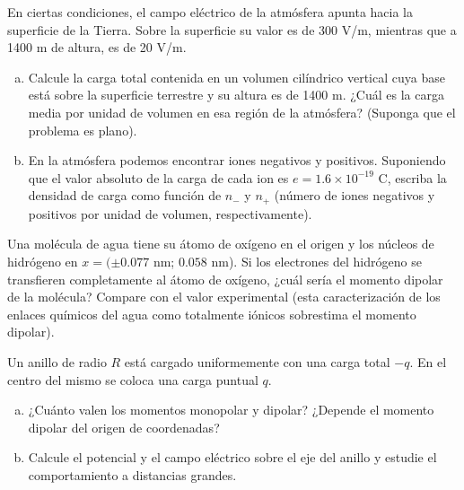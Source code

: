\documentclass[problemas]{guia}
\begin{document}
\begin{problema}{} 
    En ciertas condiciones, el campo eléctrico de la atmósfera apunta hacia la
    superficie de la Tierra. Sobre la superficie su valor es de 300 V/m, 
    mientras que a 1400 m de altura, es de 20 V/m.
    \begin{enumerate}[(a)]
        \item Calcule la carga total contenida en un volumen cilíndrico 
            vertical cuya base está sobre la superficie terrestre y su altura 
            es de 1400 m. ¿Cuál es la carga media por unidad de volumen en esa
            región de la atmósfera? (Suponga que el problema es plano). 
        \item En la atmósfera podemos encontrar iones negativos y positivos. 
            Suponiendo que el valor absoluto de la carga de cada ion es 
            $e = 1.6\times10^{-19}$ C, escriba la densidad de carga como 
            función de $n_-$ y $n_+$ (número de iones negativos y positivos 
            por unidad de volumen, respectivamente).
    \end{enumerate}
\end{problema}

\begin{problema}{} 
    Una molécula de agua tiene su átomo de oxígeno en el origen y los núcleos 
    de hidrógeno en $x = ( \pm 0.077$ nm; $0.058$ nm). Si los electrones del 
    hidrógeno se transfieren completamente al átomo de oxígeno, ¿cuál sería el
    momento dipolar de la molécula? Compare con el valor experimental (esta 
    caracterización de los enlaces químicos del agua como totalmente iónicos 
    sobrestima el momento dipolar).
\end{problema}

\begin{problema}{} 
    Un anillo de radio $R$ está cargado uniformemente con una carga total $-q$.
    En el centro del mismo se coloca una carga puntual $q$.
    \begin{enumerate}[(a)]
        \item ¿Cuánto valen los momentos monopolar y dipolar? ¿Depende el 
            momento dipolar del origen de coordenadas?
        \item Calcule el potencial y el campo eléctrico sobre el eje del anillo
            y estudie el comportamiento a distancias grandes.
    \end{enumerate}
\end{problema}
\end{document}
